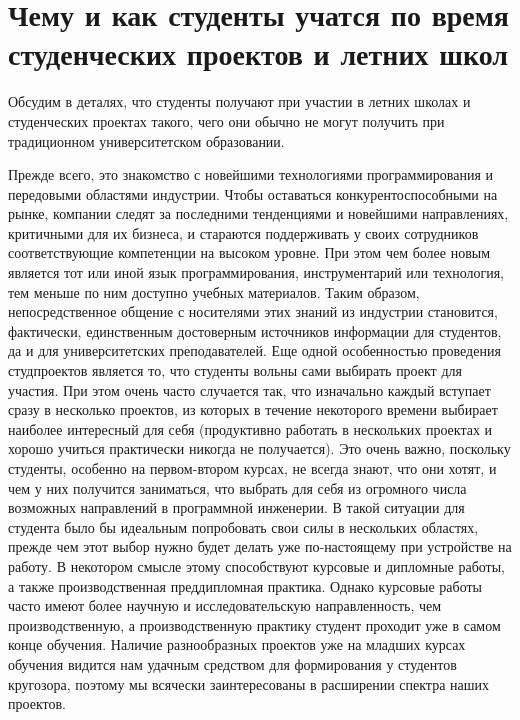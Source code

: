\documentclass[a5paper]{article}
\begin{document}
\section{Чему и как студенты учатся по время студенческих проектов и летних школ}

Обсудим в деталях, что студенты получают при участии в летних школах и студенческих проектах такого, чего они обычно не могут получить при традиционном университетском образовании.

Прежде всего, это знакомство с новейшими технологиями программирования и передовыми областями индустрии. Чтобы оставаться конкурентоспособными на рынке, компании следят за последними тенденциями и новейшими направлениях, критичными для их бизнеса, и стараются поддерживать у своих сотрудников соответствующие компетенции на высоком уровне. При этом чем более новым является тот или иной язык программирования, инструментарий или технология, тем меньше по ним доступно учебных материалов. Таким образом, непосредственное общение с носителями этих знаний из индустрии становится, фактически, единственным достоверным источников информации для студентов, да и для университетских преподавателей.  
Еще одной особенностью проведения студпроектов является то, что студенты вольны сами выбирать проект для участия. При этом очень часто случается так, что изначально каждый вступает сразу в несколько проектов, из которых в течение некоторого времени выбирает наиболее интересный для себя (продуктивно работать в нескольких проектах и хорошо учиться практически никогда не получается). Это очень важно, поскольку студенты, особенно на первом-втором курсах, не всегда знают, что они хотят, и чем у них получится заниматься, что выбрать для себя из огромного числа возможных направлений в программной инженерии. В такой ситуации для студента было бы идеальным попробовать свои силы в нескольких областях, прежде чем этот выбор нужно будет делать уже по-настоящему при устройстве на работу. В некотором смысле этому способствуют курсовые и дипломные работы, а также производственная преддипломная практика. Однако курсовые работы часто имеют более научную и  исследовательскую направленность, чем производственную, а производственную практику студент проходит уже в самом конце обучения. Наличие разнообразных проектов уже на младших курсах обучения видится нам удачным средством для формирования у студентов кругозора, поэтому мы всячески заинтересованы в расширении спектра наших проектов. 
\end{document}
